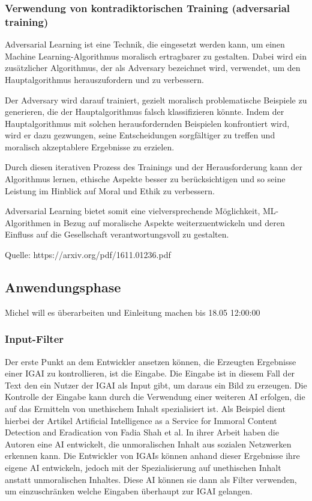 \documentclass[12pt]{article}
\begin{document}
\subsubsection{Verwendung von kontradiktorischen Training (adversarial training)}
Adversarial Learning ist eine Technik, die eingesetzt werden kann, um einen Machine Learning-Algorithmus moralisch ertragbarer zu gestalten. 
Dabei wird ein zusätzlicher Algorithmus, der als Adversary bezeichnet wird, verwendet, um den Hauptalgorithmus herauszufordern und zu verbessern. 

Der Adversary wird darauf trainiert, gezielt moralisch problematische Beispiele zu generieren, die der Hauptalgorithmus falsch klassifizieren könnte. 
Indem der Hauptalgorithmus mit solchen herausfordernden Beispielen konfrontiert wird, wird er dazu gezwungen, seine Entscheidungen sorgfältiger zu treffen und moralisch akzeptablere Ergebnisse zu erzielen. 

Durch diesen iterativen Prozess des Trainings und der Herausforderung kann der Algorithmus lernen, ethische Aspekte besser zu berücksichtigen und so seine Leistung im Hinblick auf Moral und Ethik zu verbessern. 

Adversarial Learning bietet somit eine vielversprechende Möglichkeit, ML-Algorithmen in Bezug auf moralische Aspekte weiterzuentwickeln und deren Einfluss auf die Gesellschaft verantwortungsvoll zu gestalten.

Quelle: https://arxiv.org/pdf/1611.01236.pdf

\subsection{Anwendungsphase}

Michel will es überarbeiten und Einleitung machen bis 18.05 12:00:00
\subsubsection{Input-Filter}
Der erste Punkt an dem Entwickler ansetzen können, die Erzeugten Ergebnisse einer IGAI zu kontrollieren, ist die Eingabe. Die Eingabe ist in diesem Fall der Text den ein Nutzer der IGAI als Input gibt, um daraus ein Bild zu erzeugen. Die Kontrolle der Eingabe kann durch die Verwendung einer weiteren AI erfolgen, die auf das Ermitteln von unethischem Inhalt spezialisiert ist. Als Beispiel dient hierbei der Artikel Artificial Intelligence as a Service for Immoral Content Detection and Eradication von Fadia Shah et al. In ihrer Arbeit haben die Autoren eine AI entwickelt, die unmoralischen Inhalt aus sozialen Netzwerken erkennen kann. Die Entwickler von IGAIs können anhand dieser Ergebnisse ihre eigene AI entwickeln, jedoch mit der Spezialisierung auf unethischen Inhalt anstatt unmoralischen Inhaltes. Diese AI können sie dann als Filter verwenden, um einzuschränken welche Eingaben überhaupt zur IGAI gelangen.
\end{document}
